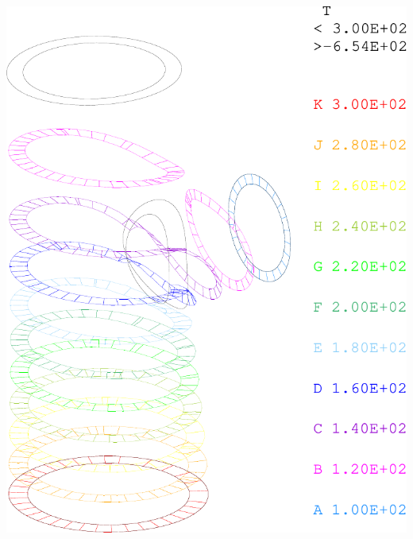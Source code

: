 \begin{frame}{}
\begin{itemize}
{\begin{textblock*}{10cm}
        \begin{center}
          \includegraphics[height=0.4\textheight]{images/te_temperature}\hspace{1cm}

\end{center}
\end{textblock*}}
\end{itemize}
\end{frame}
